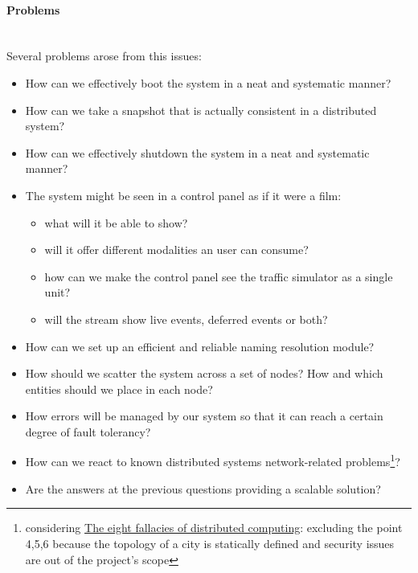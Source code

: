 \paragraph{Problems} \mbox{} \\

Several problems arose from this issues:

\begin{itemize}
\item How can we effectively boot the system in a neat and systematic manner?
\item How can we take a snapshot that is actually consistent in a distributed
  system?
\item How can we effectively shutdown the system in a neat and systematic
  manner?
\item The system might be seen in a control panel as if it were a film:
  \begin{itemize}
  \item what will it be able to show?
  \item will it offer different modalities an user can consume?
  \item how can we make the control panel see the traffic simulator as a
    single unit?
  \item will the stream show live events, deferred events or both?
  \end{itemize}
\item How can we set up an efficient and reliable naming resolution module?
\item How should we scatter the system across a set of nodes? How and which
  entities should we place in each node?
\item How errors will be managed by our system so that it can reach a certain
  degree of fault tolerancy?
\item How can we react to known distributed systems network-related
problems\footnote{considering \href{https://blogs.oracle.com/jag/resource/Fallacies.html?cm_mc_uid=82650292107114582847614&cm_mc_sid_50200000=1458564821}{The eight fallacies of distributed computing}: excluding the point 4,5,6 because the topology of a city is statically defined and security issues are out of the project's scope}?
\item Are the answers at the previous questions providing a scalable solution?
\end{itemize}


